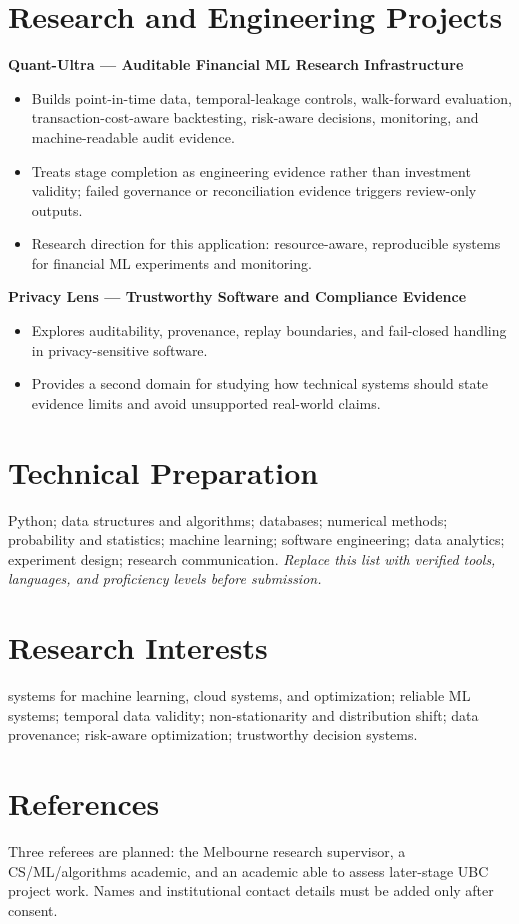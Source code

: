 \documentclass[11pt]{article}
\begin{document}
\section*{Research and Engineering Projects}
\textbf{Quant-Ultra --- Auditable Financial ML Research Infrastructure}
\begin{itemize}
\item Builds point-in-time data, temporal-leakage controls, walk-forward evaluation, transaction-cost-aware backtesting, risk-aware decisions, monitoring, and machine-readable audit evidence.
\item Treats stage completion as engineering evidence rather than investment validity; failed governance or reconciliation evidence triggers review-only outputs.
\item Research direction for this application: resource-aware, reproducible systems for financial ML experiments and monitoring.
\end{itemize}

\textbf{Privacy Lens --- Trustworthy Software and Compliance Evidence}
\begin{itemize}
\item Explores auditability, provenance, replay boundaries, and fail-closed handling in privacy-sensitive software.
\item Provides a second domain for studying how technical systems should state evidence limits and avoid unsupported real-world claims.
\end{itemize}

\section*{Technical Preparation}
Python; data structures and algorithms; databases; numerical methods; probability and statistics; machine learning; software engineering; data analytics; experiment design; research communication. \textit{Replace this list with verified tools, languages, and proficiency levels before submission.}

\section*{Research Interests}
systems for machine learning, cloud systems, and optimization; reliable ML systems; temporal data validity; non-stationarity and distribution shift; data provenance; risk-aware optimization; trustworthy decision systems.

\section*{References}
Three referees are planned: the Melbourne research supervisor, a CS/ML/algorithms academic, and an academic able to assess later-stage UBC project work. Names and institutional contact details must be added only after consent.
\end{document}
